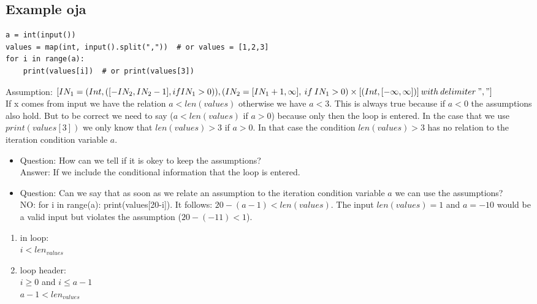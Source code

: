 \documentclass[11pt]{article}
\begin{document}
\subsection{Example oja}
\begin{lstlisting}
a = int(input())
values = map(int, input().split(","))  # or values = [1,2,3]
for i in range(a):
    print(values[i])  # or print(values[3])
\end{lstlisting}


Assumption: $[IN_1 = (Int, ([-IN_2, IN_2-1], if IN_1 > 0)), (IN_2 = [IN_1+1, \infty],\:if\:IN_1 > 0) \times [(Int, [-\infty, \infty])]\:with\:delimiter\:","]$\\


If x comes from input we have the relation $a < len(values)$ otherwise we have $a < 3$. This is always true because if $a < 0$ the assumptions also hold. But to be correct we need to say ($a < len(values)$ if $a > 0$) because only then the loop is entered. In the case that we use $print(values[3])$ we only know that $len(values) > 3$ if $a > 0$. In that case the condition $len(values) > 3$ has no relation to the iteration condition variable $a$.\\
\begin{itemize}
  \item Question: How can we tell if it is okey to keep the assumptions?\\
  Answer: If we include the conditional information that the loop is entered.
  \item Question: Can we say that as soon as we relate an assumption to the iteration condition variable $a$ we can use the assumptions?\\
  NO: for i in range(a): print(values[20-i]). It follows: $20-(a-1) < len(values)$. The input $len(values) = 1$ and $a = -10$ would be a valid input but violates the assumption ($20-(-11) < 1$).
\end{itemize}


\begin{enumerate}
  \item in loop:\\
  $i < len_{values}$
  
  \item loop header:\\
  $i \geq 0$ and $i \leq a-1$\\
  $a-1 < len_{values}$
\end{enumerate}
\end{document}
